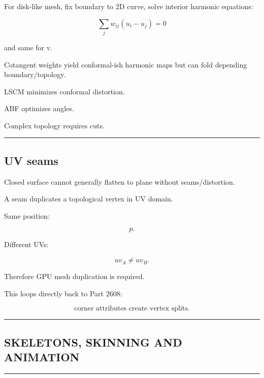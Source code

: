 For disk-like mesh, fix boundary to 2D curve, solve interior harmonic equations:

\[
\boxed{
\sum_j
w_{ij}
(u_i-u_j)=0
}
\]

and same for v.

Cotangent weights yield conformal-ish harmonic maps but can fold depending boundary/topology.

LSCM minimizes conformal distortion.

ABF optimizes angles.

Complex topology requires cuts.

\begin{center}\rule{0.5\linewidth}{0.5pt}\end{center}

\subsection{UV seams}\label{04-visual-computing-ii-ch041-uv-seams}

\hypertarget{04-visual-computing-ii-ch041-uv-seams}{}

Closed surface cannot generally flatten to plane without seams/distortion.

A seam duplicates a topological vertex in UV domain.

Same position:

\[
p.
\]

Different UVs:

\[
uv_A\ne uv_B.
\]

Therefore GPU mesh duplication is required.

This loops directly back to Part 2608:

\[
\boxed{
\text{corner attributes create vertex splits}.
}
\]

\begin{center}\rule{0.5\linewidth}{0.5pt}\end{center}

\subsection{SKELETONS, SKINNING AND ANIMATION}\label{04-visual-computing-ii-ch041-skeletons-skinning-and-animation}

\hypertarget{04-visual-computing-ii-ch041-skeletons-skinning-and-animation}{}

\begin{center}\rule{0.5\linewidth}{0.5pt}\end{center}

